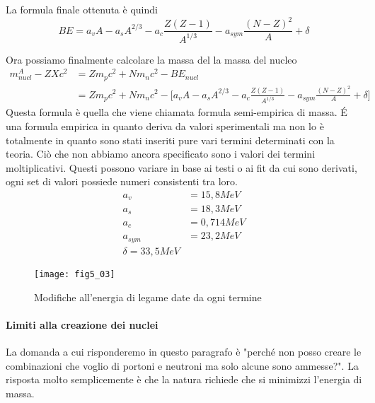 La formula finale ottenuta è quindi
\begin{equation}
BE=a_vA-a_sA^{2/3}-a_c\frac{Z(Z-1)}{A^{1/3}}-a_{sym}\frac{(N-Z)^2}{A}+\delta
\end{equation}

Ora possiamo finalmente calcolare la massa del la massa del nucleo
\begin{equation}
\begin{split}
m_{nucl} ^A-Z X c^2 &=Z m_p c^2+N m_n c^2- BE_{nucl} \\
&=Zm_pc^2+Nm_nc^2-\biggl[ a_v A-a_s A^{2/3}-a_c \frac{Z(Z-1)}{A^{1/3}}-a_{sym}\frac{(N-Z)^2}{A}+\delta \biggl]
\end{split}
\end{equation}
Questa formula è quella che viene chiamata formula semi-empirica di massa.
\'E una formula empirica in quanto deriva da valori sperimentali ma non lo è totalmente in quanto sono stati inseriti pure vari termini determinati con la teoria.
Ciò che non abbiamo ancora specificato sono i valori dei termini moltiplicativi. 
Questi possono variare in base ai testi o ai fit da cui sono derivati, ogni set di valori possiede numeri consistenti tra loro.
\begin{equation}
\begin{split}
a_v &=15,8MeV\\
a_s&=18,3MeV\\
a_c&=0,714MeV\\
a_{sym}&=23,2MeV\\
\delta=33,5MeV
\end{split}
\end{equation}
\begin{figure}[h]
\centering
\texttt{[image: fig5\_03]}
\caption{Modifiche all'energia di legame date da ogni termine}
\end{figure}

\paragraph{Limiti alla creazione dei nuclei}
La domanda a cui risponderemo in questo paragrafo è "perché non posso creare le combinazioni che voglio di portoni e neutroni ma solo alcune sono ammesse?".
La risposta molto semplicemente è che la natura richiede che si minimizzi l'energia di massa.

